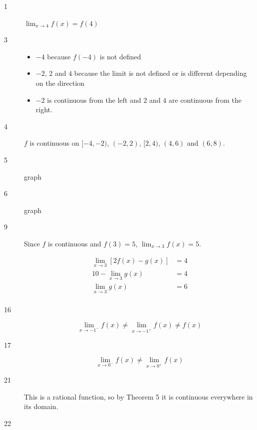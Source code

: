 \documentclass[letterpaper, landscape]{exam}
\begin{document}
    \begin{description}

      \item[1] $\lim_{x \to 4} f(x) = f(4)$

      \item[3] 
        \begin{itemize}
          \item $-4$ because $f(-4)$ is not defined

          \item $-2$, $2$ and $4$ because the limit is not defined or is different
            depending on the direction

          \item $-2$ is continuous from the left and $2$ and $4$ are continuous from the
            right.

        \end{itemize}

      \item[4] $f$ is continuous on $[-4, -2)$, $(-2, 2)$, $[2, 4)$, $(4, 6)$ 
          and $(6, 8)$.

      \item[5] graph

      \item[6] graph

      \item[9] Since $f$ is continuous and $f(3) = 5$, $\lim_{x \to 3} f(x) = 5$.

        \begin{align*}
          \lim_{x \to 3} \left[ 2 f(x) - g(x) \right] & = 4 \\
          10 - \lim_{x \to 3} g(x)                    & = 4 \\
          \lim_{x \to 3} g(x)                         & = 6 \\
        \end{align*}

      \item[16] 
        \[
          \lim_{x \to -1^-} f(x) \neq \lim_{x \to -1^+} f(x) \neq f(x)
        \]

      \item[17] 
        \[
          \lim_{x \to 0^-} f(x) \neq \lim_{x \to 0^+} f(x) 
        \]

      \item[21] This is a rational function, so by Theorem 5 it is continuous everywhere
        in its domain.

      \item[22] 
        

\end{description}
\end{document}
